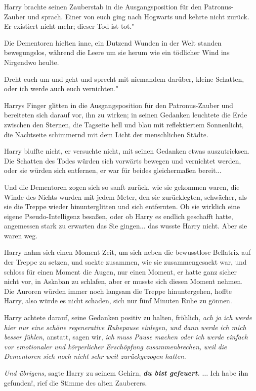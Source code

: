 Harry brachte seinen Zauberstab in die Ausgangsposition für den Patronus-Zauber
und sprach. \glqq{}Einer von euch ging nach Hogwarts und kehrte nicht zurück. Er
existiert nicht mehr; dieser Tod ist tot."

Die Dementoren hielten inne, ein Dutzend Wunden in der Welt standen
bewegungslos, während die Leere um sie herum wie ein tödlicher Wind ins
Nirgendwo heulte.

\glqq{}Dreht euch um und geht und sprecht mit niemandem darüber, kleine Schatten,
oder ich werde auch euch vernichten."

Harrys Finger glitten in die Ausgangsposition für den Patronus-Zauber und
bereiteten sich darauf vor, ihn zu wirken; in seinen Gedanken leuchtete die Erde
zwischen den Sternen, die Tagseite hell und blau mit reflektiertem Sonnenlicht,
die Nachtseite schimmernd mit dem Licht der menschlichen Städte.

Harry bluffte nicht, er versuchte nicht, mit seinen Gedanken etwas
auszutricksen. Die Schatten des Todes würden sich vorwärts bewegen und
vernichtet werden, oder sie würden sich entfernen, er war für beides
gleichermaßen bereit...

Und die Dementoren zogen sich so sanft zurück, wie sie gekommen waren, die Winde
des Nichts wurden mit jedem Meter, den sie zurücklegten, schwächer, als sie die
Treppe wieder hinunterglitten und sich entfernten. Ob sie wirklich eine eigene
Pseudo-Intelligenz besaßen, oder ob Harry es endlich geschafft hatte, angemessen
stark zu erwarten das Sie gingen... das wusste Harry nicht. Aber sie waren weg.

Harry nahm sich einen Moment Zeit, um sich neben die bewusstlose Bellatrix auf
der Treppe zu setzen, und sackte zusammen, wie sie zusammengesackt war, und
schloss für einen Moment die Augen, nur einen Moment, er hatte ganz sicher nicht
vor, in Askaban zu schlafen, aber er musste sich diesen Moment nehmen. Die
Auroren würden immer noch langsam die Treppe hinuntergehen, hoffte Harry, also
würde es nicht schaden, sich nur fünf Minuten Ruhe zu gönnen.

Harry achtete darauf, seine Gedanken positiv zu halten, fröhlich, \emph{ach ja
ich werde hier nur eine schöne regenerative Ruhepause einlegen, und dann werde
ich mich besser fühlen,} anstatt, sagen wir, \emph{ich muss Pause machen oder
ich werde einfach vor emotionaler und körperlicher Erschöpfung zusammenbrechen,
weil die Dementoren sich noch nicht sehr weit zurückgezogen hatten.}

\emph{Und übrigens,} sagte Harry zu seinem Gehirn, \textbf{\emph{du bist
gefeuert.} }
\textbf{}
\textbf{}
... \glqq{}Ich habe ihn gefunden!\grqq{}, rief die Stimme des alten Zauberers.

